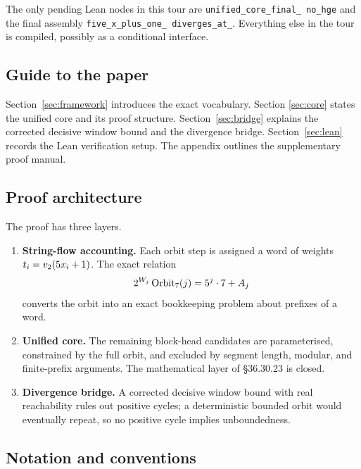 The only pending Lean nodes in this tour are
\texttt{unified\_\allowbreak core\_\allowbreak final\_\allowbreak
no\_\allowbreak hge} and the final assembly
\texttt{five\_\allowbreak x\_\allowbreak plus\_\allowbreak one\_\allowbreak
diverges\_\allowbreak at\_}.  Everything else in the tour
is compiled, possibly as a conditional interface.

\subsection{Guide to the paper}

Section~\ref{sec:framework} introduces the exact vocabulary.  Section
\ref{sec:core} states the unified core and its proof structure.
Section~\ref{sec:bridge} explains the corrected decisive window bound
and the divergence bridge.  Section~\ref{sec:lean} records the Lean
verification setup.  The appendix outlines the supplementary proof
manual.

\subsection{Proof architecture}

The proof has three layers.

\begin{enumerate}[leftmargin=*]
\item \textbf{String-flow accounting.}  Each orbit step is assigned a
word of weights $t_i=v_2\!\left(5x_i+1\right)$.  The exact relation
\begin{equation*}
  2^{W_j}\,\mathrm{Orbit}_7(j)
    =5^j\cdot 7+A_j
\end{equation*}
converts the orbit into an exact bookkeeping problem about prefixes of
a word.
\item \textbf{Unified core.}  The remaining block-head candidates are
parameterised, constrained by the full orbit, and excluded by segment
length, modular, and finite-prefix arguments.  The mathematical layer
of \S36.30.23 is closed.
\item \textbf{Divergence bridge.}  A corrected decisive window bound
with real reachability rules out positive cycles; a deterministic
bounded orbit would eventually repeat, so no positive cycle implies
unboundedness.
\end{enumerate}

\subsection{Notation and conventions}

